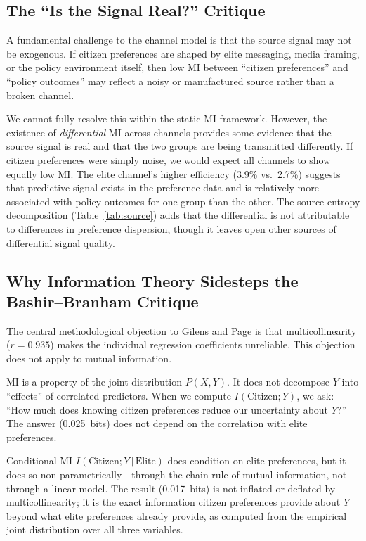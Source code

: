 \documentclass[twocolumn,10pt]{article}
\begin{document}
\subsection{The ``Is the Signal Real?'' Critique}

A fundamental challenge to the channel model is that the source signal may not be exogenous.  If citizen preferences are shaped by elite messaging, media framing, or the policy environment itself, then low MI between ``citizen preferences'' and ``policy outcomes'' may reflect a noisy or manufactured source rather than a broken channel.

We cannot fully resolve this within the static MI framework.  However, the existence of \emph{differential} MI across channels provides some evidence that the source signal is real and that the two groups are being transmitted differently.  If citizen preferences were simply noise, we would expect all channels to show equally low MI.  The elite channel's higher efficiency (3.9\% vs.\ 2.7\%) suggests that predictive signal exists in the preference data and is relatively more associated with policy outcomes for one group than the other.  The source entropy decomposition (Table~\ref{tab:source}) adds that the differential is not attributable to differences in preference dispersion, though it leaves open other sources of differential signal quality.

\subsection{Why Information Theory Sidesteps the Bashir--Branham Critique}

The central methodological objection to Gilens and Page is that multicollinearity ($r = 0.935$) makes the individual regression coefficients unreliable.  This objection does not apply to mutual information.

MI is a property of the joint distribution $P(X,Y)$.  It does not decompose $Y$ into ``effects'' of correlated predictors.  When we compute $I(\text{Citizen}; Y)$, we ask: ``How much does knowing citizen preferences reduce our uncertainty about $Y$?''  The answer (0.025~bits) does not depend on the correlation with elite preferences.

Conditional MI $I(\text{Citizen}; Y \,|\, \text{Elite})$ does condition on elite preferences, but it does so non-parametrically---through the chain rule of mutual information, not through a linear model.  The result (0.017~bits) is not inflated or deflated by multicollinearity; it is the exact information citizen preferences provide about $Y$ beyond what elite preferences already provide, as computed from the empirical joint distribution over all three variables.
\end{document}
